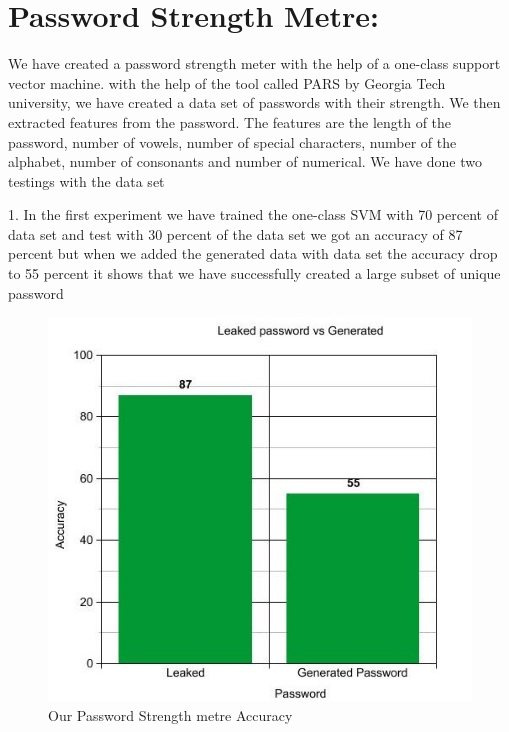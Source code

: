 \documentclass[runningheads]{llncs}
\begin{document}
\section{Password Strength Metre:}
{We have created a password strength meter with the help of a one-class support vector machine. with the help of the tool called PARS by Georgia Tech university, we have created a data set of passwords with their strength. We then extracted features from the password. The features are the length of the password, number of vowels, number of special characters, number of the alphabet, number of consonants and number of numerical. We have done two testings with the data set \par 1. In the first experiment we have trained the one-class SVM with 70 percent of data set and test with 30 percent of the data set we got an accuracy of 87 percent but when we added the generated data with data set the accuracy drop to 55 percent it shows that we have successfully created a large subset of unique password
\par
\begin{figure}
  \centering
\begin{minipage}[b]{0.8\textwidth}
  \begin{mdframed}
    \includegraphics[width=\textwidth]{graph.jpg}
    \end{mdframed}
    \caption{Our Password Strength metre Accuracy}
  \end{minipage}

\end{figure}}
\end{document}
